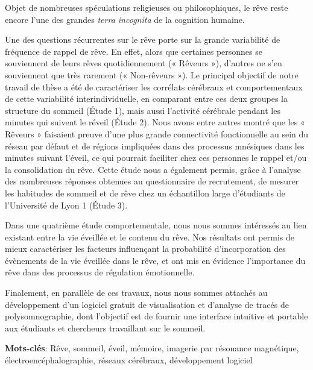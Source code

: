 Objet de nombreuses spéculations religieuses ou philosophiques, le rêve reste encore l'une des grandes \emph{terra incognita} de la cognition humaine.

Une des questions récurrentes sur le rêve porte sur la grande variabilité de fréquence de rappel de rêve. En effet, alors que certaines personnes se souviennent de leurs rêves quotidiennement (« Rêveurs »), d’autres ne s’en souviennent que très rarement (« Non-rêveurs »). Le principal objectif de notre travail de thèse a été de caractériser les corrélats cérébraux et comportementaux de cette variabilité interindividuelle, en comparant entre ces deux groupes la structure du sommeil (Étude 1), mais aussi l’activité cérébrale pendant les minutes qui suivent le réveil (Étude 2). Nous avons entre autres montré que les « Rêveurs » faisaient preuve d’une plus grande connectivité fonctionnelle au sein du réseau par défaut et de régions impliquées dans des processus mnésiques dans les minutes suivant l’éveil, ce qui pourrait faciliter chez ces personnes le rappel et/ou la consolidation du rêve. Cette étude nous a également permis, grâce à l’analyse des nombreuses réponses obtenues au questionnaire de recrutement, de mesurer les habitudes de sommeil et de rêve chez un échantillon large d’étudiants de l’Université de Lyon 1 (Étude 3).

Dans une quatrième étude comportementale, nous nous sommes intéressés au lien existant entre la vie éveillée et le contenu du rêve. Nos résultats ont permis de mieux caractériser les facteurs influençant la probabilité d’incorporation des évènements de la vie éveillée dans le rêve, et ont mis en évidence l’importance du rêve dans des processus de régulation émotionnelle.

Finalement, en parallèle de ces travaux, nous nous sommes attachés au développement d’un logiciel gratuit de visualisation et d’analyse de tracés de polysomnographie, dont l’objectif est de fournir une interface intuitive et portable aux étudiants et chercheurs travaillant sur le sommeil.

\textbf{Mots-clés}: Rêve, sommeil, éveil, mémoire, imagerie par résonance magnétique, électroencéphalographie, réseaux cérébraux, développement logiciel
